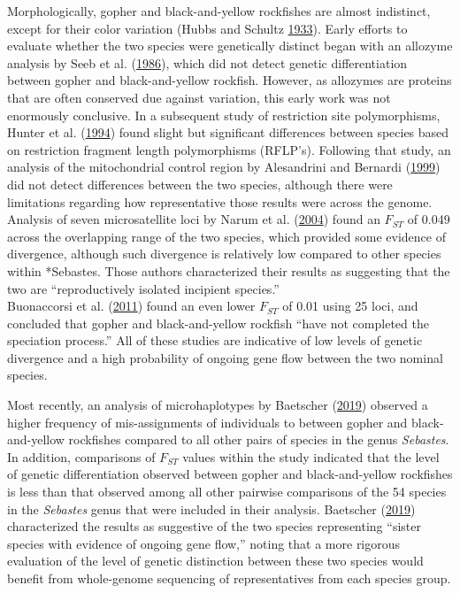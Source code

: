 \documentclass[12pt,]{article}
\begin{document}
Morphologically, gopher and black-and-yellow rockfishes are almost
indistinct, except for their color variation (Hubbs and Schultz
\protect\hyperlink{ref-Hubbs1933}{1933}). Early efforts to evaluate
whether the two species were genetically distinct began with an allozyme
analysis by Seeb et al. (\protect\hyperlink{ref-Seeb1986}{1986}), which
did not detect genetic differentiation between gopher and
black-and-yellow rockfish. However, as allozymes are proteins that are
often conserved due against variation, this early work was not
enormously conclusive. In a subsequent study of restriction site
polymorphisms, Hunter et al. (\protect\hyperlink{ref-Hunter1994}{1994})
found slight but significant differences between species based on
restriction fragment length polymorphisms (RFLP's). Following that
study, an analysis of the mitochondrial control region by Alesandrini
and Bernardi (\protect\hyperlink{ref-Alesandrini1999}{1999}) did not
detect differences between the two species, although there were
limitations regarding how representative those results were across the
genome. Analysis of seven microsatellite loci by Narum et al.
(\protect\hyperlink{ref-Narum2004}{2004}) found an \(F_{ST}\) of 0.049
across the overlapping range of the two species, which provided some
evidence of divergence, although such divergence is relatively low
compared to other species within *Sebastes. Those authors characterized
their results as suggesting that the two are ``reproductively isolated
incipient species.''\\
Buonaccorsi et al. (\protect\hyperlink{ref-Buonaccorsi2011}{2011}) found
an even lower \(F_{ST}\) of 0.01 using 25 loci, and concluded that
gopher and black-and-yellow rockfish ``have not completed the speciation
process.'' All of these studies are indicative of low levels of genetic
divergence and a high probability of ongoing gene flow between the two
nominal species.

Most recently, an analysis of microhaplotypes by Baetscher
(\protect\hyperlink{ref-Baetscher2019}{2019}) observed a higher
frequency of mis-assignments of individuals to between gopher and
black-and-yellow rockfishes compared to all other pairs of species in
the genus \emph{Sebastes}. In addition, comparisons of \(F_{ST}\) values
within the study indicated that the level of genetic differentiation
observed between gopher and black-and-yellow rockfishes is less than
that observed among all other pairwise comparisons of the 54 species in
the \emph{Sebastes} genus that were included in their analysis.
Baetscher (\protect\hyperlink{ref-Baetscher2019}{2019}) characterized
the results as suggestive of the two species representing ``sister
species with evidence of ongoing gene flow,'' noting that a more
rigorous evaluation of the level of genetic distinction between these
two species would benefit from whole-genome sequencing of
representatives from each species group.
\end{document}
